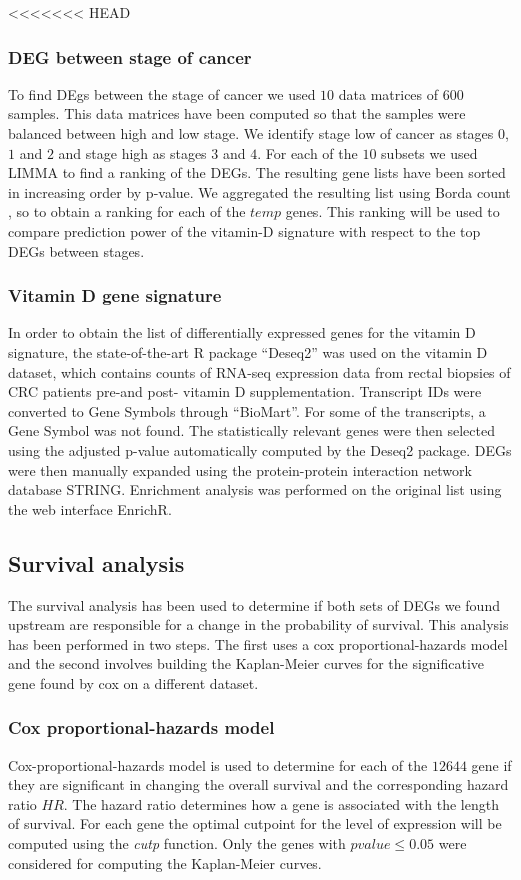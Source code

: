 \documentclass[fleqn,10pt]{SelfArx} %
\begin{document}
<<<<<<< HEAD
		\subsubsection{DEG between stage of cancer}
		To find DEgs between the stage of cancer we used $10$ data matrices of $600$ samples.
		This data matrices have been computed so that the samples were balanced between high and low stage.
		We identify stage low of cancer as stages $0$, $1$ and $2$ and stage high as stages $3$ and $4$.
		For each of the $10$ subsets we used LIMMA \cite{limma} to find a ranking of the DEGs.
		The resulting gene lists have been sorted in increasing order by p-value.
		We aggregated the resulting list using Borda count \cite{borda}, so to obtain a ranking for each of the $temp$ genes.
		This ranking will be used to compare prediction power of the vitamin-D signature with respect to the top DEGs between stages.

		\subsubsection{Vitamin D gene signature}
		In order to obtain the list of differentially expressed genes for the vitamin D signature, the state-of-the-art R package “Deseq2” was used on the vitamin D dataset, which contains counts of RNA-seq expression data from rectal biopsies of CRC patients pre-and post- vitamin D supplementation. Transcript IDs were converted to Gene Symbols through “BioMart”. For some of the transcripts, a Gene Symbol was not found. The statistically relevant genes were then selected using the adjusted p-value automatically computed by the Deseq2 package. DEGs were then manually expanded using the protein-protein interaction network database STRING.
Enrichment analysis was performed on the original list using the web interface EnrichR.


	\subsection{Survival analysis}
	The survival analysis has been used to determine if both sets of DEGs we found upstream are responsible for a change in the probability of survival.
	This analysis has been performed in two steps.
	The first uses a cox proportional-hazards model and the second involves building the Kaplan-Meier curves for the significative gene found by cox on a different dataset.

		\subsubsection{Cox proportional-hazards model}
		Cox-proportional-hazards model is used to determine for each of the $12644$ gene if they are significant in changing the overall survival and the corresponding hazard ratio $HR$.
		The hazard ratio determines how a gene is associated with the length of survival.
		For each gene the optimal cutpoint for the level of expression will be computed using the \emph{cutp} function.
		Only the genes with $pvalue \le 0.05$ were considered for computing the Kaplan-Meier curves.
\end{document}
